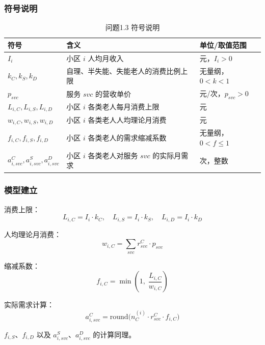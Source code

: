 \documentclass[12pt,a4paper]{article}
\begin{document}
\subsubsection{符号说明}
\begin{table}[htbp]
\centering
\caption{问题1.3 符号说明}
\label{tab:symbols_1.3}
\begin{tabular}{@{} l p{5.5cm} l @{}}
\toprule
符号 & 含义 & 单位/取值范围 \\
\midrule
$I_i$ & 小区 $i$ 人均月收入 & 元，$I_i > 0$ \\
$k_C, k_S, k_D$ & 自理、半失能、失能老人的消费比例上限 & 无量纲，$0 < k < 1$ \\
$p_{svc}$ & 服务 $svc$ 的营收单价 & 元/次，$p_{svc} > 0$ \\
$L_{i,C}, L_{i,S}, L_{i,D}$ & 小区 $i$ 各类老人每月消费上限 & 元 \\
$w_{i,C}, w_{i,S}, w_{i,D}$ & 小区 $i$ 各类老人人均理论月消费 & 元 \\
$f_{i,C}, f_{i,S}, f_{i,D}$ & 小区 $i$ 各类老人的需求缩减系数 & 无量纲，$0 < f \leq 1$ \\
$a_{i,svc}^C, a_{i,svc}^S, a_{i,svc}^D$ & 小区 $i$ 各类老人对服务 $svc$ 的实际月需求 & 次，整数 \\
\bottomrule
\end{tabular}
\end{table}

\subsubsection{模型建立}
消费上限：
\begin{equation}
L_{i,C} = I_i \cdot k_C,\quad L_{i,S} = I_i \cdot k_S,\quad L_{i,D} = I_i \cdot k_D
\tag{3.1}
\end{equation}

人均理论月消费：
\begin{equation}
w_{i,C} = \sum_{svc} r_{svc}^C \cdot p_{svc}
\tag{3.2}
\end{equation}

缩减系数：
\begin{equation}
f_{i,C} = \min\left(1,\; \frac{L_{i,C}}{w_{i,C}}\right)
\tag{3.3}
\end{equation}

实际需求计算：
\begin{equation}
a_{i,svc}^C = \text{round}\bigl(n_C^{(i)} \cdot r_{svc}^C \cdot f_{i,C}\bigr)
\tag{3.4}
\end{equation}

$f_{i,S}$、$f_{i,D}$ 以及 $a_{i,svc}^S$、$a_{i,svc}^D$ 的计算同理。
\end{document}
